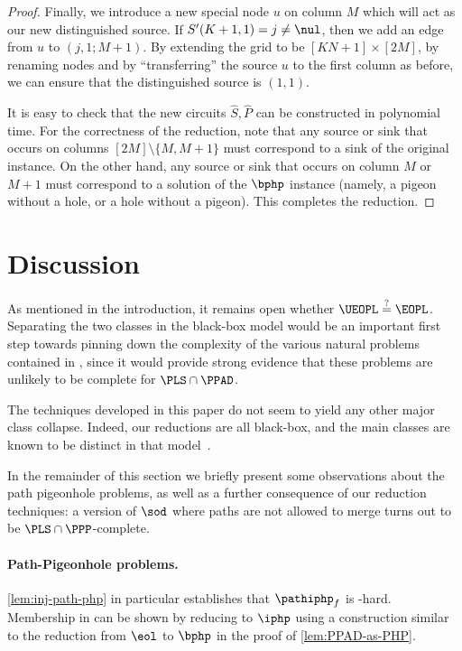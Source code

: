 \begin{proof}
Finally, we introduce a new special node $u$ on column $M$ which will act as our new distinguished source. If $S'(K+1,1) = j \neq \nul$, then we add an edge from $u$ to $(j,1;M+1)$. By extending the grid to be $[KN+1] \times [2M]$, by renaming nodes and by ``transferring'' the source $u$ to the first column as before, we can ensure that the distinguished source is $(1,1)$.

It is easy to check that the new circuits $\widehat{S}, \widehat{P}$ can be constructed in polynomial time. For the correctness of the reduction, note that any source or sink that occurs on columns $[2M] \setminus \{M,M+1\}$ must correspond to a sink of the original \sopl instance. On the other hand, any source or sink that occurs on column $M$ or $M+1$ must correspond to a solution of the $\bphp$ instance (namely, a pigeon without a hole, or a hole without a pigeon). This completes the reduction.
\end{proof}



\section{Discussion}\label{sec:discussion}


As mentioned in the introduction, it remains open whether $\UEOPL \overset{?}{=} \EOPL$. Separating the two classes in the black-box model would be an important first step towards pinning down the complexity of the various natural problems contained in \UEOPL, since it would provide strong evidence that these problems are unlikely to be complete for $\PLS\cap\PPAD$.

The techniques developed in this paper do not seem to yield any other major class collapse. Indeed, our reductions are all black-box, and the main classes are known to be distinct in that model~\cite{Beame1998,Morioka2001,Buresh2004,Goos2022}.

In the remainder of this section we briefly present some observations about the path pigeonhole problems, as well as a further consequence of our reduction techniques: a version of $\sod$ where paths are not allowed to merge turns out to be $\PLS\cap\PPP$-complete.


\paragraph{Path-Pigeonhole problems.}
\cref{lem:inj-path-php} in particular establishes that $\pathiphp_f$ is \PPADS-hard. Membership in \PPADS can be shown by reducing to $\iphp$ using a construction similar to the reduction from $\eol$ to $\bphp$ in the proof of \cref{lem:PPAD-as-PHP}.

